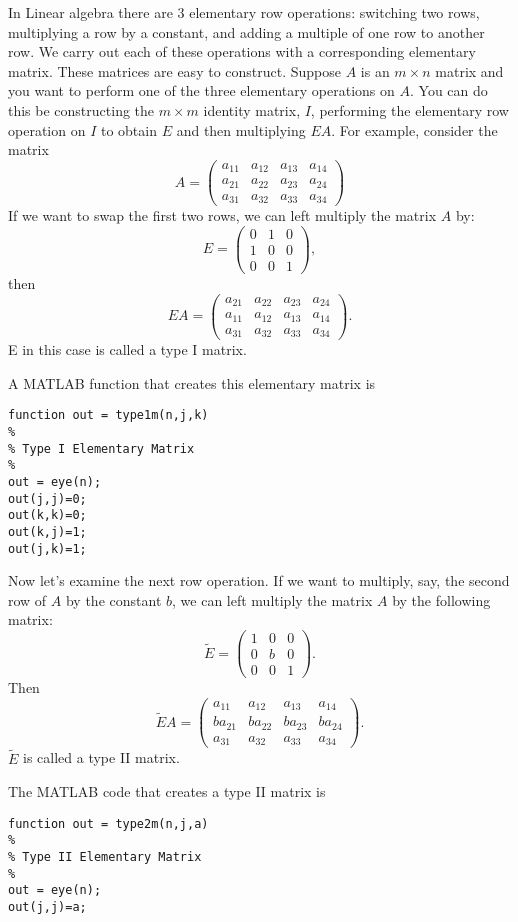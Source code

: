 \label{lab:LUdecomp}

In Linear algebra there are 3 elementary row operations: switching two rows, multiplying a row by a constant, and adding a multiple of one row to another row.  We carry out each of these operations with a corresponding elementary matrix.  These matrices are easy to construct. Suppose $A$ is an $m \times n$ matrix and you want to perform one of the three elementary operations on $A$. You can do this be constructing the $m \times m$ identity matrix, $I$, performing the elementary row operation on $I$ to obtain $E$ and then multiplying $EA$.  For example, consider the matrix
\[
A = \begin{pmatrix}
a_{11}&a_{12}&a_{13}&a_{14}\\
a_{21}&a_{22}&a_{23}&a_{24}\\
a_{31}&a_{32}&a_{33}&a_{34}
\end{pmatrix}
\]
If we want to swap the first two rows, we can left multiply the
matrix $A$ by:
\[
E = \begin{pmatrix}
0&1&0\\
1&0&0\\
0&0&1
\end{pmatrix},
\]
then
\[
E A =
\begin{pmatrix}
a_{21}&a_{22}&a_{23}&a_{24}\\
a_{11}&a_{12}&a_{13}&a_{14}\\
a_{31}&a_{32}&a_{33}&a_{34}
\end{pmatrix}.
\]
E in this case is called a type I matrix.
\begin{matlab}
A MATLAB function that creates this elementary matrix is
\begin{lstlisting}[style=matlab]
function out = type1m(n,j,k)
%
% Type I Elementary Matrix
%
out = eye(n); 
out(j,j)=0; 
out(k,k)=0; 
out(k,j)=1; 
out(j,k)=1;
\end{lstlisting}
\end{matlab}

Now let's examine the next row operation.  If we want to multiply,
say, the second row of $A$ by the constant $b$, we can left multiply
the matrix $A$ by the following matrix:
\[
\tilde{E} = \begin{pmatrix}
1&0&0\\
0&b&0\\
0&0&1
\end{pmatrix}.
\]
Then
\[
\tilde{E} A =
\begin{pmatrix}
a_{11}&a_{12}&a_{13}&a_{14}\\
b a_{21}&b a_{22}&b a_{23}&b a_{24}\\
a_{31}&a_{32}&a_{33}&a_{34}
\end{pmatrix}.
\]
$\tilde{E}$ is called a type II matrix.  
\begin{matlab}
The MATLAB code that creates a type II matrix is
\begin{lstlisting}[style=matlab]
function out = type2m(n,j,a)
%
% Type II Elementary Matrix
%
out = eye(n); 
out(j,j)=a;
\end{lstlisting}
\end{matlab}

